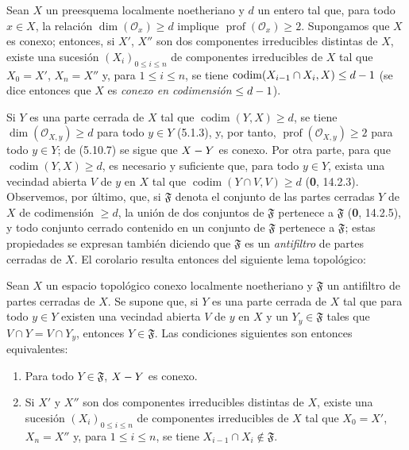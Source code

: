 \begin{corollary}[5.10.8]
\label{IV.2.s5.10.8-fr}
Sean $X$ un preesquema localmente noetheriano y $d$ un entero tal que, para
todo $x\in X$, la relación $\dim(\mathcal O_x)\geq d$ implique
$\operatorname{prof}(\mathcal O_x)\geq2$. Supongamos que $X$ es conexo;
entonces, si $X'$, $X''$ son dos componentes irreducibles distintas de $X$,
existe una sucesión $(X_i)_{0\leq i\leq n}$ de componentes irreducibles de
$X$ tal que $X_0=X'$, $X_n=X''$ y, para $1\leq i\leq n$, se tiene
$\operatorname{codim}(X_{i-1}\cap X_i,X)\leq d- 1$
\textup{(se dice entonces que $X$ es \emph{conexo en codimensión} $\leq d- 1$)}.
\end{corollary}

Si $Y$ es una parte cerrada de $X$ tal que
$\operatorname{codim}(Y,X)\geq d$, se tiene $\dim(\mathcal O_{X,y})\geq d$
para todo $y\in Y$ (5.1.3), y, por tanto,
$\operatorname{prof}(\mathcal O_{X,y})\geq2$ para todo $y\in Y$; de (5.10.7)
se sigue que $X- Y$ es conexo. Por otra parte, para que
$\operatorname{codim}(Y,X)\geq d$, es necesario y suficiente que, para todo
$y\in Y$, exista una vecindad abierta $V$ de $y$ en $X$ tal que
$\operatorname{codim}(Y\cap V,V)\geq d$ (\textbf 0, 14.2.3). Observemos, por último,
que, si $\mathfrak F$ denota el conjunto de las partes cerradas $Y$ de $X$ de
codimensión $\geq d$, la unión de dos conjuntos de $\mathfrak F$ pertenece a
$\mathfrak F$ (\textbf 0, 14.2.5), y todo conjunto cerrado contenido en un conjunto de
$\mathfrak F$ pertenece a $\mathfrak F$; estas propiedades se expresan también
diciendo que $\mathfrak F$ es un \emph{antifiltro} de partes cerradas de $X$.
El corolario resulta entonces del siguiente lema topológico:

\begin{lemma}[5.10.8.1]
\label{IV.2.s5.10.8.1-fr}
Sean $X$ un espacio topológico conexo localmente noetheriano y $\mathfrak F$
un antifiltro de partes cerradas de $X$. Se supone que, si $Y$ es una parte
cerrada de $X$ tal que para todo $y\in Y$ existen una vecindad abierta $V$ de
$y$ en $X$ y un $Y_y\in\mathfrak F$ tales que $V\cap Y=V\cap Y_y$, entonces
$Y\in\mathfrak F$. Las condiciones siguientes son entonces equivalentes:
\begin{enumerate}
\item[\textup{a)}] Para todo $Y\in\mathfrak F$, $X- Y$ es conexo.
\item[\textup{b)}] Si $X'$ y $X''$ son dos componentes irreducibles distintas de $X$,
existe una sucesión $(X_i)_{0\leq i\leq n}$ de componentes irreducibles de
$X$ tal que $X_0=X'$, $X_n=X''$ y, para $1\leq i\leq n$, se tiene
$X_{i-1}\cap X_i\notin\mathfrak F$.
\end{enumerate}
\end{lemma}

